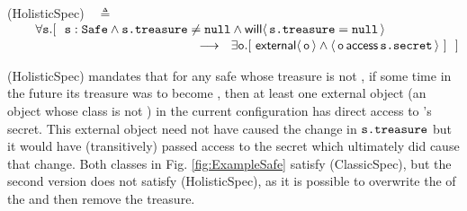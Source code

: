   \vspace{.01in}
(HolisticSpec)\ \  $\triangleq$\\ 
$\strut \hspace{.3in}   \forall \prg{s}. %
[\ \ \prg{s}:\prg{Safe} \wedge \prg{s.treasure}\neq\prg{null}   \wedge   \Future{\prg{s.treasure}=\prg{null}} $ \\ 
 $ \strut \hspace{5.3cm}     \longrightarrow \ \  \exists \prg{o}. [\  \External{\prg{o}} \wedge  \CanAccess{\prg{o}}{\prg{s.secret}}\ ]  \  \ ] \hfill $
\vspace{-.05in}

(HolisticSpec) mandates that for any safe 
whose treasure is not , 
if some time in the future its treasure was to become ,
then at least one external object (\ie an object whose class is not ) in the current configuration
has direct access to 's secret. This external object need not have caused the change in ${\mbox{\tt{s.treasure}}}$ but it would 
 have (transitively) passed access to the secret which ultimately did cause that change.
%
Both classes in Fig. \ref{fig:ExampleSafe} satisfy (ClassicSpec), but the second version does not satisfy 
(HolisticSpec), as 
it is possible to overwrite the  of the  and then remove the treasure.
% 
%
\vspace{.02in}
%
% 

